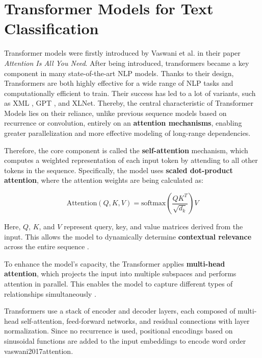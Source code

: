 \section{Transformer Models for Text Classification}


Transformer models were firstly introduced by Vaswani et al. \parencite{vaswani2017attention} in their paper \textit{Attention Is All You Need}. After being introduced, transformers became a key component in many state-of-the-art NLP models. Thanks to their design, Transformers are both highly effective for a wide range of NLP tasks and computationally efficient to train. Their success has led to a lot of variants, such as XML \parencite{lample2019cross}, GPT \parencite{radford2018gpt}, and XLNet\parencite{yang2019xlnet}. Thereby, the central characteristic of Transformer Models lies on their reliance, unlike previous sequence models based on recurrence or convolution, entirely on an \textbf{attention mechanisms}, enabling greater parallelization and more effective modeling of long-range dependencies.

Therefore, the core component is called the \textbf{self-attention} mechanism, which computes a weighted representation of each input token by attending to all other tokens in the sequence. Specifically, the model uses \textbf{scaled dot-product attention}, where the attention weights are being calculated as:

\[
\text{Attention}(Q, K, V) = \text{softmax}\left(\frac{QK^T}{\sqrt{d_k}}\right)V
\]

Here, $Q$, $K$, and $V$ represent query, key, and value matrices derived from the input. This allows the model to dynamically determine \textbf{contextual relevance} across the entire sequence \parencite{vaswani2017attention}.

To enhance the model's capacity, the Transformer applies \textbf{multi-head attention}, which projects the input into multiple subspaces and performs attention in parallel. This enables the model to capture different types of relationships simultaneously \parencite{vaswani2017attention}.

Transformers use a stack of encoder and decoder layers, each composed of multi-head self-attention, feed-forward networks, and residual connections with layer normalization. Since no recurrence is used, positional encodings based on sinusoidal functions are added to the input embeddings to encode word order {vaswani2017attention}.

